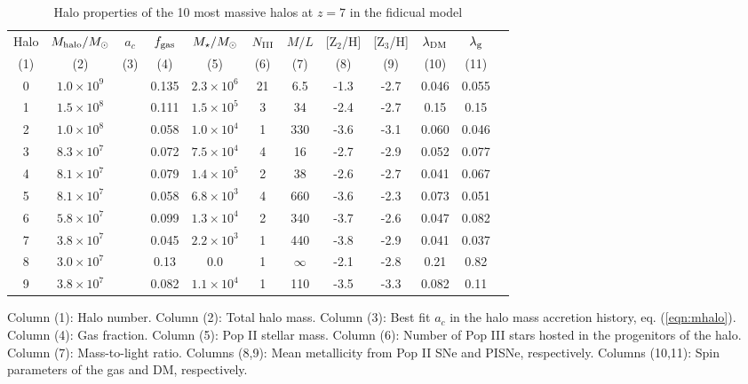 \begin{table*}
\begin{minipage}{13cm}
\caption{Halo properties of the 10 most massive halos at $z=7$ in the
  fidicual model}
\label{tab:halos}
\begin{tabular}{@{}cccccccccccc}
\hline 

Halo & $M_{\rm halo}/\Ms$ & $a_c$ & $f_{\rm gas}$ & $M_\star/\Ms$ & $N_{\rm
  III}$ & $M/L$ & [Z$_2$/H] & [Z$_3$/H] & $\lambda_{\rm DM}$ &
$\lambda_{\rm g}$ \\

(1) & (2) & (3) & (4) & (5) & (6) & (7) & (8) & (9) & (10) & (11) \\

\hline

0 & $1.0 \times 10^9$ & & 0.135 & $2.3 \times 10^6$ & 21 & 6.5 & -1.3 &
-2.7 & 0.046 & 0.055 \\

1 & $1.5 \times 10^8$ & & 0.111 & $1.5 \times 10^5$ & 3 & 34 & -2.4 &
-2.7 & 0.15 & 0.15 \\

2 & $1.0 \times 10^8$ & & 0.058 & $1.0 \times 10^4$ & 1 & 330 & -3.6 &
-3.1 & 0.060 & 0.046 \\

3 & $8.3 \times 10^7$ & & 0.072 & $7.5 \times 10^4$ & 4 & 16 & -2.7 &
-2.9 & 0.052 & 0.077 \\

4 & $8.1 \times 10^7$ & & 0.079 & $1.4 \times 10^5$ & 2 & 38 & -2.6 &
-2.7 & 0.041 & 0.067 \\

5 & $8.1 \times 10^7$ & & 0.058 & $6.8 \times 10^3$ & 4 & 660 & -3.6 &
-2.3 & 0.073 & 0.051 \\

6 & $5.8 \times 10^7$ & & 0.099 & $1.3 \times 10^4$ & 2 & 340 & -3.7 &
-2.6 & 0.047 & 0.082 \\

7 & $3.8 \times 10^7$ & & 0.045 & $2.2 \times 10^3$ & 1 & 440 & -3.8 &
-2.9 & 0.041 & 0.037 \\

8 & $3.0 \times 10^7$ & & 0.13 & $0.0$ & 1 & $\infty$ & -2.1 & -2.8 & 0.21 &
0.82 \\

9 & $3.8 \times 10^7$ & & 0.082 & $1.1 \times 10^4$ & 1 & 110 & -3.5 &
-3.3 & 0.082 & 0.11 \\

\hline
\end{tabular}
\medskip

Column (1): Halo number.  Column (2): Total halo mass.  Column (3):
Best fit $a_c$ in the halo mass accretion history,
eq. (\ref{eqn:mhalo}).  Column (4): Gas fraction.  Column (5): Pop II
stellar mass.  Column (6): Number of Pop III stars hosted in the
progenitors of the halo.  Column (7): Mass-to-light ratio.  Columns
(8,9): Mean metallicity from Pop II SNe and PISNe, respectively.
Columns (10,11): Spin parameters of the gas and DM, respectively.

\end{minipage}
\end{table*}
